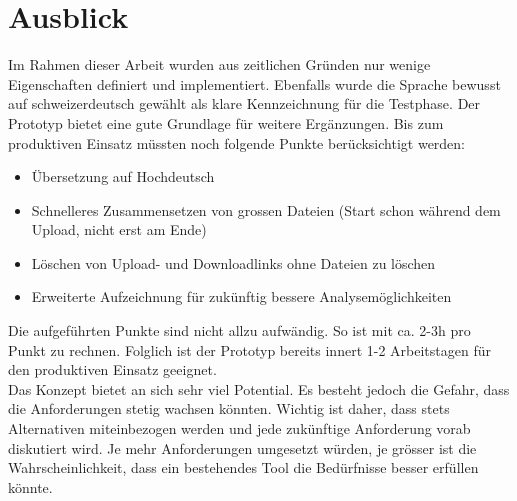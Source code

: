\chapter{Ausblick}
Im Rahmen dieser Arbeit wurden aus zeitlichen Gründen nur wenige Eigenschaften definiert und implementiert.
Ebenfalls wurde die Sprache bewusst auf schweizerdeutsch gewählt als klare Kennzeichnung für die Testphase. 
Der Prototyp bietet eine gute Grundlage für weitere Ergänzungen. 
Bis zum produktiven Einsatz müssten noch folgende Punkte berücksichtigt werden:
\begin{itemize}
    \item Übersetzung auf Hochdeutsch
    \item Schnelleres Zusammensetzen von grossen Dateien (Start schon während dem Upload, nicht erst am Ende)
    \item Löschen von Upload- und Downloadlinks ohne Dateien zu löschen
    \item Erweiterte Aufzeichnung für zukünftig bessere Analysemöglichkeiten
\end{itemize}
Die aufgeführten Punkte sind nicht allzu aufwändig. So ist mit ca. 2-3h pro Punkt zu rechnen. 
Folglich ist der Prototyp bereits innert 1-2 Arbeitstagen für den produktiven Einsatz geeignet.
\\
Das Konzept bietet an sich sehr viel Potential. 
Es besteht jedoch die Gefahr, dass die Anforderungen stetig wachsen könnten.
Wichtig ist daher, dass stets Alternativen miteinbezogen werden und jede zukünftige Anforderung vorab diskutiert wird.
Je mehr Anforderungen umgesetzt würden, je grösser ist die Wahrscheinlichkeit, 
dass ein bestehendes Tool die Bedürfnisse besser erfüllen könnte. 

